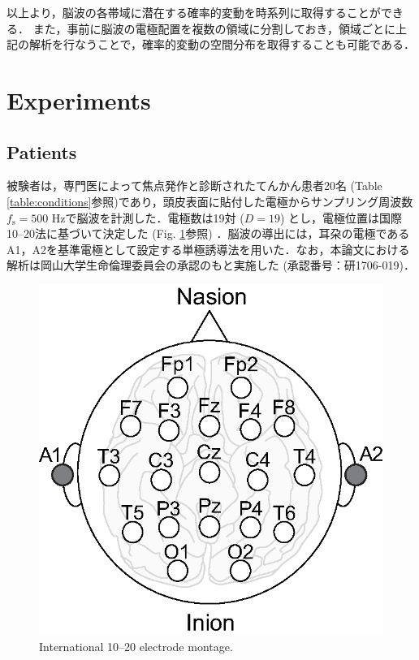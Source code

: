 \documentclass[journal]{IEEEtran}
\begin{document}
以上より，脳波の各帯域に潜在する確率的変動を時系列に取得することができる．
また，事前に脳波の電極配置を複数の領域に分割しておき，領域ごとに上記の解析を行なうことで，確率的変動の空間分布を取得することも可能である．
\section{Experiments}
\subsection{Patients}
被験者は，専門医によって焦点発作と診断されたてんかん患者20名 (Table \ref{table:conditions}参照)であり，頭皮表面に貼付した電極からサンプリング周波数$f_\mathrm{s} = 500$ Hzで脳波を計測した．電極数は19対 ($D=19$) とし，電極位置は国際10--20法に基づいて決定した (Fig. \ref{fig:electrodes}参照) ．脳波の導出には，耳朶の電極であるA1，A2を基準電極として設定する単極誘導法を用いた．なお，本論文における解析は岡山大学生命倫理委員会の承認のもと実施した (承認番号：研1706-019)．


\begin{figure}[!t]
\centering
\includegraphics[width=0.6\hsize]{figure/electrodes.eps}
\caption{International 10--20 electrode montage.}
\label{fig:electrodes}
\end{figure}
\end{document}
